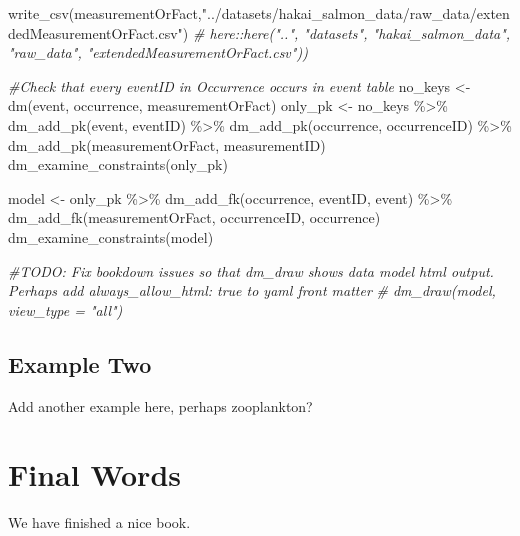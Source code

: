 \documentclass[
]{book}
\newenvironment{Shaded}{\begin{snugshade}}{\end{snugshade}}
\newcommand{\CommentTok}[1]{\textcolor[rgb]{0.56,0.35,0.01}{\textit{#1}}}
\newcommand{\FunctionTok}[1]{\textcolor[rgb]{0.00,0.00,0.00}{#1}}
\newcommand{\NormalTok}[1]{#1}
\newcommand{\OtherTok}[1]{\textcolor[rgb]{0.56,0.35,0.01}{#1}}
\newcommand{\SpecialCharTok}[1]{\textcolor[rgb]{0.00,0.00,0.00}{#1}}
\newcommand{\StringTok}[1]{\textcolor[rgb]{0.31,0.60,0.02}{#1}}
\begin{document}
\begin{Shaded}
\begin{Highlighting}[]
\FunctionTok{write\_csv}\NormalTok{(measurementOrFact,}\StringTok{"../datasets/hakai\_salmon\_data/raw\_data/extendedMeasurementOrFact.csv"}\NormalTok{) }\CommentTok{\# here::here("..", "datasets", "hakai\_salmon\_data", "raw\_data",   "extendedMeasurementOrFact.csv"))}
\end{Highlighting}
\end{Shaded}

\begin{Shaded}
\begin{Highlighting}[]
\CommentTok{\#Check that every eventID in Occurrence occurs in event table}
\NormalTok{no\_keys }\OtherTok{\textless{}{-}} \FunctionTok{dm}\NormalTok{(event, occurrence, measurementOrFact)}
\NormalTok{only\_pk }\OtherTok{\textless{}{-}}\NormalTok{ no\_keys }\SpecialCharTok{\%\textgreater{}\%} 
  \FunctionTok{dm\_add\_pk}\NormalTok{(event, eventID) }\SpecialCharTok{\%\textgreater{}\%} 
  \FunctionTok{dm\_add\_pk}\NormalTok{(occurrence, occurrenceID) }\SpecialCharTok{\%\textgreater{}\%} 
  \FunctionTok{dm\_add\_pk}\NormalTok{(measurementOrFact, measurementID)}
\FunctionTok{dm\_examine\_constraints}\NormalTok{(only\_pk)}

\NormalTok{model }\OtherTok{\textless{}{-}}\NormalTok{ only\_pk }\SpecialCharTok{\%\textgreater{}\%} 
  \FunctionTok{dm\_add\_fk}\NormalTok{(occurrence, eventID, event) }\SpecialCharTok{\%\textgreater{}\%} 
  \FunctionTok{dm\_add\_fk}\NormalTok{(measurementOrFact, occurrenceID, occurrence)}
\FunctionTok{dm\_examine\_constraints}\NormalTok{(model)}

\CommentTok{\#TODO: Fix bookdown issues so that dm\_draw shows data model html output. Perhaps add  \textasciigrave{}always\_allow\_html: true\textasciigrave{} to yaml front matter}
\CommentTok{\# dm\_draw(model, view\_type = "all") }
\end{Highlighting}
\end{Shaded}

\hypertarget{example-two}{%
\section{Example Two}\label{example-two}}

Add another example here, perhaps zooplankton?

\hypertarget{final-words}{%
\chapter{Final Words}\label{final-words}}

We have finished a nice book.

  
\end{document}
